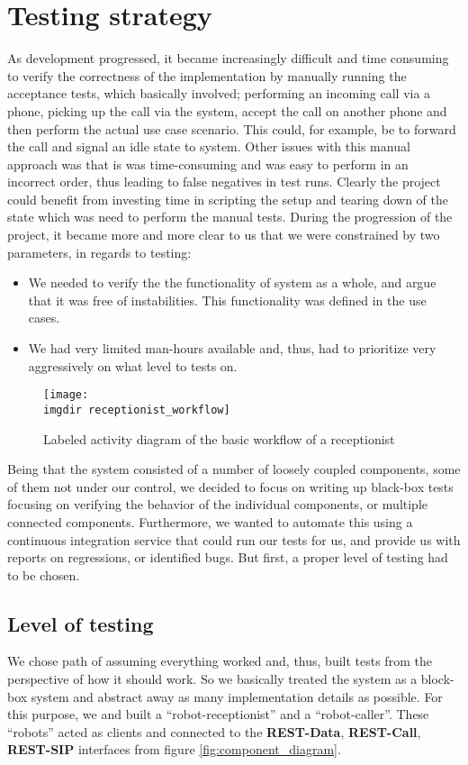 \section{Testing strategy}
\label{sec:background-testing-strategy}
As development progressed, it became increasingly difficult and time consuming to verify the correctness of the implementation by manually running the acceptance tests, which basically involved; performing an incoming call via a phone, picking up the call via the system, accept the call on another phone and then perform the actual use case scenario. This could, for example, be to forward the call and signal an idle state to system. Other issues with this manual approach was that is was time-consuming and was easy to perform in an incorrect order, thus leading to false negatives in test runs. Clearly the project could benefit from investing time in scripting the setup and tearing down of the state which was need to perform the manual tests.
During the progression of the project, it became more and more clear to us that we were constrained by two parameters, in regards to testing:
\begin{itemize}
  \item We needed to verify the the functionality of system as a whole, and argue that it was free of instabilities. This functionality was defined in the use cases.
  \item We had very limited man-hours available and, thus, had to prioritize very aggressively on what level to tests on.
\end{itemize}
\begin{figure}[ht]
\centering
\texttt{[image: \\imgdir receptionist\_workflow]}
\caption{Labeled activity diagram of the basic workflow of a receptionist}
\label{fig:receptionist_workflow}
\end{figure}
Being that the system consisted of a number of loosely coupled components, some of them not under our control, we decided to focus on writing up black-box tests focusing on verifying the behavior of the individual components, or multiple connected components.
Furthermore, we wanted to automate this using a continuous integration service that could run our tests for us, and provide us with reports on regressions, or identified bugs. But first, a proper level of testing had to be chosen.

\subsection{Level of testing}
\label{ssec:level-of-testing}
We chose path of assuming everything worked and, thus,  built tests from the perspective of how it should work. So we basically treated the system as a block-box system and abstract away as many implementation details as possible. For this purpose, we and built a ``robot-receptionist'' and a ``robot-caller''. These ``robots'' acted as clients and connected to the \textbf{REST-Data}, \textbf{REST-Call}, \textbf{REST-SIP} interfaces from figure \ref{fig:component_diagram}.\\\\

